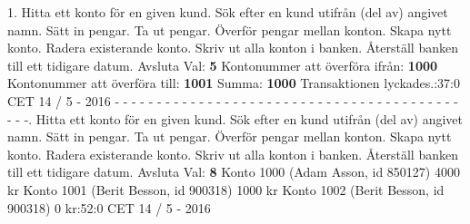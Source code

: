 1.   Hitta ett konto för en given kund.   Sök efter en kund utifrån (del av) angivet namn.   Sätt in pengar.   Ta ut pengar.   Överför pengar mellan konton.   Skapa nytt konto.   Radera existerande konto.   Skriv ut alla konton i banken.   Återställ banken till ett tidigare datum. Avsluta\newline
Val: \textbf{5}\newline
Kontonummer att överföra ifrån: \textbf{1000}\newline
Kontonummer att överföra till: \textbf{1001}\newline
Summa: \textbf{1000}\newline
Transaktionen lyckades.:37:0 CET 14 / 5 - 2016\newline
\newline
- - - - - - - - - - - - - - - - - - - - - - - - - - - - - - - - - - - - - - - - - - - -.   Hitta ett konto för en given kund.   Sök efter en kund utifrån (del av) angivet namn.   Sätt in pengar.   Ta ut pengar.   Överför pengar mellan konton.   Skapa nytt konto.   Radera existerande konto.   Skriv ut alla konton i banken.   Återställ banken till ett tidigare datum. Avsluta\newline
Val: \textbf{8}\newline
Konto 1000 (Adam Asson, id 850127) 4000 kr\newline
Konto 1001 (Berit Besson, id 900318) 1000 kr\newline
Konto 1002 (Berit Besson, id 900318) 0 kr:52:0 CET 14 / 5 - 2016\newline
